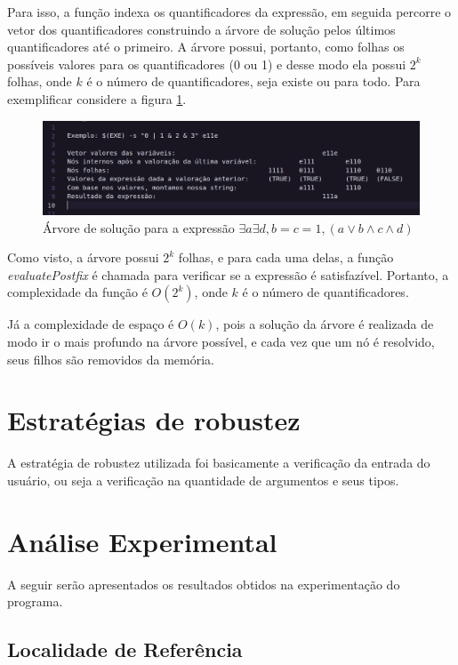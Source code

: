 \documentclass{article}
\begin{document}
Para isso, a função indexa os quantificadores da expressão, em seguida percorre o vetor dos quantificadores construindo a árvore de solução pelos últimos quantificadores até o primeiro.
A árvore possui, portanto, como folhas os possíveis valores para os quantificadores (0 ou 1) e desse modo ela possui $2^k$ folhas, onde $k$ é o número de quantificadores, seja existe ou para todo. Para exemplificar considere a figura \ref{fig:sat_tree}.

\begin{figure}[H]
    \centering
    \includegraphics[width=\textwidth]{./images/sat_tree.png}
    \caption{Árvore de solução para a expressão $\exists a \exists d , b = c = 1,  (a \lor b \land c \land d)$}
    \label{fig:sat_tree}
\end{figure}

Como visto, a árvore possui $2^k$ folhas, e para cada uma delas, a função \textit{evaluatePostfix} é chamada para verificar se a expressão é satisfazível. Portanto, a complexidade da função é $O(2^k)$, onde $k$ é o número de quantificadores.

Já a complexidade de espaço é $O(k)$, pois a solução da árvore é realizada de modo ir o mais profundo na árvore possível, e cada vez que um nó é resolvido, seus filhos são removidos da memória.
\section{Estratégias de robustez}

A estratégia de robustez utilizada foi basicamente a verificação da entrada do usuário, ou seja a verificação na quantidade de argumentos e seus tipos.

\section{Análise Experimental}

A seguir serão apresentados os resultados obtidos na experimentação do programa.

\subsection{Localidade de Referência}
\end{document}
